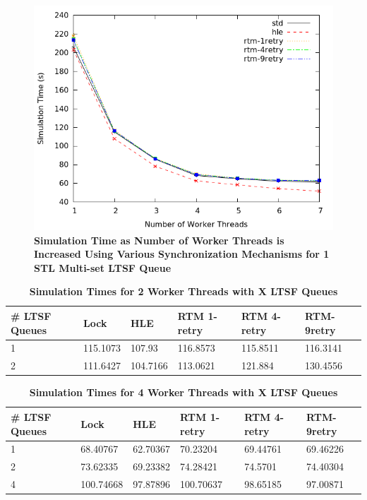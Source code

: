 \documentclass[a4paper]{article}
\begin{document}
\begin{figure}[H]
    \centering
    \graphicspath{ {./figures/} }
    \includegraphics[width=\textwidth,height=\textheight,keepaspectratio]{noThrMig-summary-multiset-hugeepidemicsim-timeVSthreads-1schQ}
    \caption{\textbf{Simulation Time as Number of Worker Threads is Increased
    Using Various Synchronization Mechanisms for 1 STL Multi-set LTSF Queue}}
    \label{fig:noThrMig_timeVSthreads_1schq}
\end{figure}

\begin{table}[H]
    \centering
    \begin{tabular}{l|p{2cm}|p{2cm}|p{2cm}|p{2cm}|p{2cm}}
        \textbf{\# LTSF Queues}&Lock &HLE &RTM 1-retry &RTM 4-retry &RTM-9retry \\
        \hline
        \midrule
            1 &115.1073 &107.93   &116.8573 &115.8511 &116.3141 \\ 
            2 &111.6427 &104.7166 &113.0621 &121.884  &130.4556   
    \end{tabular}
    \caption{\textbf{Simulation Times for 2 Worker Threads with X LTSF Queues}}
    \label{tab:noThrMig_2threadsXschq}
\end{table}

\begin{table}[H]
    \centering
    \begin{tabular}{l|p{2cm}|p{2cm}|p{2cm}|p{2cm}|p{2cm}}
        \textbf{\# LTSF Queues}&Lock &HLE &RTM 1-retry &RTM 4-retry &RTM-9retry \\
        \hline
        \midrule
            1 &68.40767  &62.70367 &70.23204  &69.44761 &69.46226 \\ 
            2 &73.62335  &69.23382 &74.28421  &74.5701  &74.40304 \\
            4 &100.74668 &97.87896 &100.70637 &98.65185 &97.00871 
    \end{tabular}
    \caption{\textbf{Simulation Times for 4 Worker Threads with X LTSF Queues}}
    \label{tab:noThrMig_4threadsXschq}
\end{table}
\end{document}
